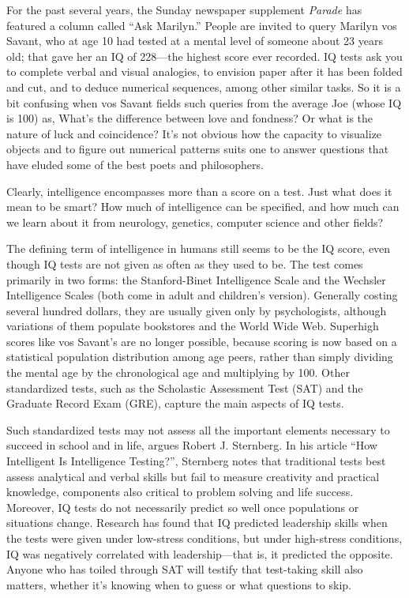 For the past several years, the Sunday newspaper
supplement \emph{Parade} has featured a column called ``Ask Marilyn.''
People are invited to query Marilyn vos Savant, who at age 10 had tested
at a mental level of someone about 23 years old; that gave her an IQ of
228---the highest score ever recorded. IQ tests ask you to complete
verbal and visual analogies, to envision paper after it has been folded
and cut, and to deduce numerical sequences, among other similar tasks.
So it is a bit confusing when vos Savant fields such queries from the
average Joe (whose IQ is 100) as, What's the difference between love and
fondness? Or what is the nature of luck and coincidence? It's not
obvious how the capacity to visualize objects and to figure out
numerical patterns suits one to answer questions that have eluded some
of the best poets and philosophers.

Clearly, intelligence encompasses more than a score on a test. Just what
does it mean to be smart? How much of intelligence can be specified, and
how much can we learn about it from neurology, genetics, computer
science and other fields?

The defining term of intelligence in humans still seems to be the IQ
score, even though IQ tests are not given as often as they used to be.
The test comes primarily in two forms: the Stanford-Binet Intelligence
Scale and the Wechsler Intelligence Scales (both come in adult and
children's version). Generally costing several hundred dollars, they are
usually given only by psychologists, although variations of them
populate bookstores and the World Wide Web. Superhigh scores like vos
Savant's are no longer possible, because scoring is now based on a
statistical population distribution among age peers, rather than simply
dividing the mental age by the chronological age and multiplying by 100.
Other standardized tests, such as the Scholastic Assessment Test (SAT)
and the Graduate Record Exam (GRE), capture the main aspects of IQ
tests.

Such standardized tests may not assess all the important elements
necessary to succeed in school and in life, argues Robert J. Sternberg.
In his article ``How Intelligent Is Intelligence Testing?'', Sternberg
notes that traditional tests best assess analytical and verbal skills
but fail to measure creativity and practical knowledge, components also
critical to problem solving and life success. Moreover, IQ tests do not
necessarily predict so well once populations or situations change.
Research has found that IQ predicted leadership skills when the tests
were given under low-stress conditions, but under high-stress
conditions, IQ was negatively correlated with leadership---that is, it
predicted the opposite. Anyone who has toiled through SAT will testify
that test-taking skill also matters, whether it's knowing when to guess
or what questions to skip.


